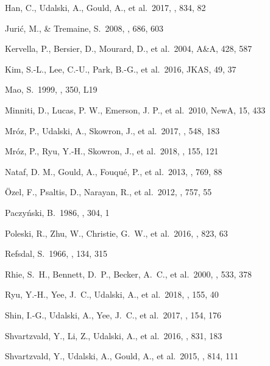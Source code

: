 \documentclass[10pt]{emulateapj}
\begin{document}
\begin{thebibliography}{999}
Han, C., Udalski, A., Gould, A., et al.\ 2017, \apj, 834, 82 

Juri{\'c}, M., \& Tremaine, S.\ 2008, \apj, 686, 603

Kervella, P., Bersier, D., Mourard, D., et al.\ 2004, A\&A, 428, 587

Kim, S.-L., Lee, C.-U., Park, B.-G., et al.\ 2016, JKAS, 49, 37

Mao, S.\ 1999, \aap, 350, L19 

Minniti, D., Lucas, P. W., Emerson, J. P., et al.\ 2010, NewA, 15, 433 

Mr{\'o}z, P., Udalski, A., Skowron, J., et al.\ 2017, \nat, 548, 183 

Mr{\'o}z, P., Ryu, Y.-H., Skowron, J., et al.\ 2018, \aj, 155, 121 

Nataf, D. M., Gould, A., Fouqu\'e, P., et al.\ 2013, \apj, 769, 88

{\"O}zel, F., Psaltis, D., Narayan, R., et al.\ 2012, \apj, 757, 55 

Paczy{\'n}ski, B.\ 1986, \apj, 304, 1 

Poleski, R., Zhu, W., Christie, G.~W., et al.\ 2016, \apj, 823, 63 

Refsdal, S.\ 1966, \mnras, 134, 315 

Rhie, S.~H., Bennett, D.~P., Becker, A.~C., et al.\ 2000, \apj, 533, 378 

Ryu, Y.-H., Yee, J.~C., Udalski, A., et al.\ 2018, \aj, 155, 40 

Shin, I.-G., Udalski, A., Yee, J.~C., et al.\ 2017, \aj, 154, 176 

Shvartzvald, Y., Li, Z., Udalski, A., et al.\ 2016, \apj, 831, 183 

Shvartzvald, Y., Udalski, A., Gould, A., et al.\ 2015, \apj, 814, 111 


\end{thebibliography}
\end{document}
